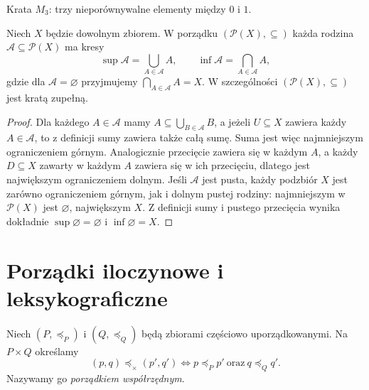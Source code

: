 \begin{center}

{\small Krata $M_3$: trzy nieporównywalne elementy między $0$ i $1$.}
\end{center}

\begin{twierdzenie}
\label{thm:powerset-complete-lattice}
Niech $X$ będzie dowolnym zbiorem. W porządku
$(\mathcal P(X),\subseteq)$ każda rodzina
$\mathcal A\subseteq\mathcal P(X)$ ma kresy
\[
 \sup\mathcal A=\bigcup_{A\in\mathcal A}A,
 \qquad \inf\mathcal A=\bigcap_{A\in\mathcal A}A,
\]
gdzie dla $\mathcal A=\varnothing$ przyjmujemy
$\bigcap_{A\in\mathcal A}A=X$. W szczególności
$(\mathcal P(X),\subseteq)$ jest kratą zupełną.
\end{twierdzenie}
\begin{proof}
Dla każdego $A\in\mathcal A$ mamy
$A\subseteq\bigcup_{B\in\mathcal A}B$, a jeżeli
$U\subseteq X$ zawiera każdy $A\in\mathcal A$, to
z definicji sumy zawiera także całą sumę. Suma jest więc
najmniejszym ograniczeniem górnym. Analogicznie
przecięcie zawiera się w każdym $A$, a każdy
$D\subseteq X$ zawarty w każdym $A$ zawiera się
w ich przecięciu, dlatego jest największym
ograniczeniem dolnym. Jeśli $\mathcal A$ jest pusta,
każdy podzbiór $X$ jest zarówno ograniczeniem górnym,
jak i dolnym pustej rodziny: najmniejszym w
$\mathcal P(X)$ jest $\varnothing$, największym $X$.
Z definicji sumy i pustego przecięcia wynika dokładnie
$\sup\varnothing=\varnothing$ i $\inf\varnothing=X$.
\end{proof}

\section{Porządki iloczynowe i leksykograficzne}\label{sec:order-products}
\begin{definicja}
Niech $(P,\preceq_P)$ i $(Q,\preceq_Q)$ będą
zbiorami częściowo uporządkowanymi. Na $P\times Q$
określamy
\[
 (p,q)\preceq_\times(p',q')\iff
 p\preceq_P p'\ \text{oraz}\ q\preceq_Q q'.
\]
Nazywamy go \emph{porządkiem współrzędnym}.
\end{definicja}

